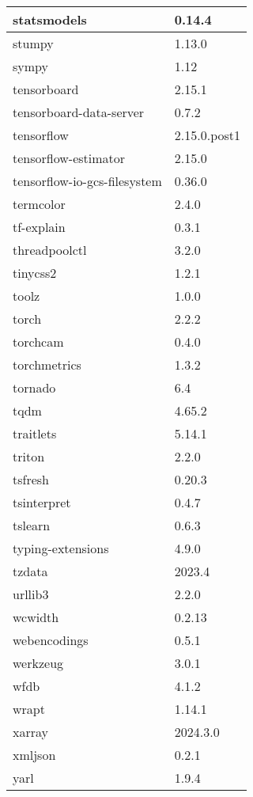 \begin{longtable}{|l|l|}
	statsmodels          & 0.14.4 \\ \hline
	stumpy               & 1.13.0 \\ \hline
	sympy                & 1.12 \\ \hline
	tensorboard          & 2.15.1 \\ \hline
	tensorboard-data-server & 0.7.2 \\ \hline
	tensorflow           & 2.15.0.post1 \\ \hline
	tensorflow-estimator & 2.15.0 \\ \hline
	tensorflow-io-gcs-filesystem & 0.36.0 \\ \hline
	termcolor            & 2.4.0 \\ \hline
	tf-explain           & 0.3.1 \\ \hline
	threadpoolctl        & 3.2.0 \\ \hline
	tinycss2             & 1.2.1 \\ \hline
	toolz                & 1.0.0 \\ \hline
	torch                & 2.2.2 \\ \hline
	torchcam             & 0.4.0 \\ \hline
	torchmetrics         & 1.3.2 \\ \hline
	tornado              & 6.4 \\ \hline
	tqdm                 & 4.65.2 \\ \hline
	traitlets            & 5.14.1 \\ \hline
	triton               & 2.2.0 \\ \hline
	tsfresh              & 0.20.3 \\ \hline
	tsinterpret          & 0.4.7 \\ \hline
	tslearn              & 0.6.3 \\ \hline
	typing-extensions    & 4.9.0 \\ \hline
	tzdata               & 2023.4 \\ \hline
	urllib3              & 2.2.0 \\ \hline
	wcwidth              & 0.2.13 \\ \hline
	webencodings         & 0.5.1 \\ \hline
	werkzeug             & 3.0.1 \\ \hline
	wfdb                 & 4.1.2 \\ \hline
	wrapt                & 1.14.1 \\ \hline
	xarray               & 2024.3.0 \\ \hline
	xmljson              & 0.2.1 \\ \hline
	yarl                 & 1.9.4 \\ \hline
\end{longtable}